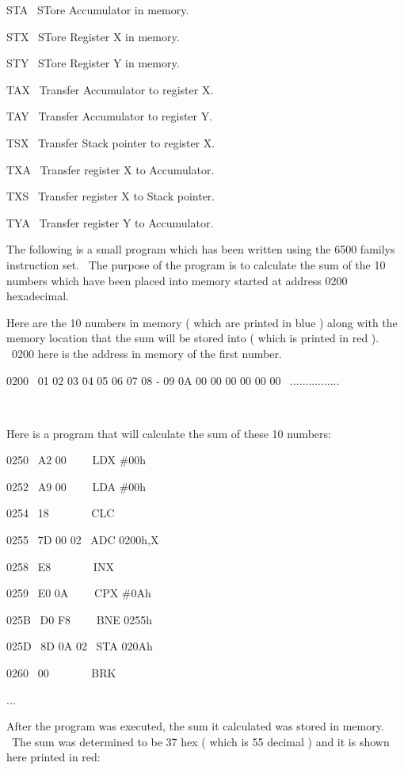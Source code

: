 \documentclass[12pt,twoside]{book}
\begin{document}
STA \ STore Accumulator in memory.

STX \ STore Register X in memory.

STY \ STore Register Y in memory.

TAX \ Transfer Accumulator to register X.

TAY \ Transfer Accumulator to register Y.

TSX \ Transfer Stack pointer to register X.

TXA \ Transfer register X to Accumulator.

TXS \ Transfer register X to Stack pointer.

TYA \ Transfer register Y to Accumulator. \ \ 


\bigskip

The following is a small program which has been written using the 6500
family{\textquotesingle}s instruction set. \ The purpose of the program
is to calculate the sum of the 10 numbers which have been placed into
memory started at address 0200 hexadecimal.


\bigskip

Here are the 10 numbers in memory ( which are printed in blue ) along
with the memory location that the sum will be stored into ( which is
printed in red ). \ 0200 here is the address in memory of the first
number.


\bigskip

0200 \ 01 02 03 04 05 06 07 08 {}- 09 0A 00 00 00 00 00 00
\ ................

\ 

Here is a program that will calculate the sum of these 10 numbers:


\bigskip

0250 \ A2 00 \ \ \ \ LDX \#00h

0252 \ A9 00 \ \ \ \ LDA \#00h

0254 \ 18 \ \ \ \ \ \ \ CLC 

0255 \ 7D 00 02 \ ADC 0200h,X

0258 \ E8 \ \ \ \ \ \ \ INX 

0259 \ E0 0A \ \ \ \ CPX \#0Ah

025B \ D0 F8 \ \ \ \ BNE 0255h

025D \ 8D 0A 02 \ STA 020Ah

0260 \ 00 \ \ \ \ \ \ \ BRK 

...


\bigskip

After the program was executed, the sum it calculated was stored in
memory. \ The sum was determined to be 37 hex ( which is 55 decimal )
and it is shown here printed in red:
\end{document}

